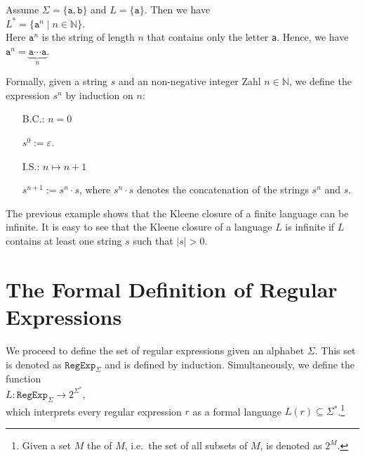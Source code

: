 \exampleEng
Assume $\Sigma = \{ \texttt{a}, \texttt{b} \}$ and  $L = \{ \texttt{a} \}$.  Then we have
\\[0.2cm]
\hspace*{1.3cm}
$L^* = \{ \texttt{a}^n \mid n \in \mathbb{N} \}$.
\\[0.2cm]
Here $\texttt{a}^n$ is the string of length $n$ that contains only the letter \texttt{a}.  Hence, we have 
\\[0.2cm]
\hspace*{1.3cm}
$\texttt{a}^n = \underbrace{\texttt{a} \cdots \texttt{a}}_n$.  \eox 


Formally, given a string $s$ and an non-negative integer Zahl $n \in \mathbb{N}$, we define the expression
 $s^n$ by induction on  $n$:
\begin{enumerate}
\item[B.C.:] $n = 0$

             $s^0 := \varepsilon$. 
\item[I.S.:] $n \mapsto n + 1$

             $s^{n+1} := s^n\cdot s$, \quad where $s^n \cdot s$ denotes the concatenation of the strings $s^n$ and $s$.
             \eox
\end{enumerate}

The previous example shows that the Kleene closure of a finite language can be infinite.
It is easy to see that the Kleene closure of a language $L$ is infinite
if $L$ contains at least one string $s$ such that $|s| > 0$.
\vspace*{0.3cm}

\section{The Formal Definition of Regular Expressions}
We proceed to define the set of regular expressions given an  alphabet $\Sigma$.  This set is
denoted as $\texttt{RegExp}_\Sigma$  
and is defined by induction.  Simultaneously,  we define
the function
\\[0.2cm]
\hspace*{1.3cm}
$L: \texttt{RegExp}_\Sigma \rightarrow 2^{\Sigma^*}$,
\\[0.2cm]
which interprets every regular expression  $r$ as a formal language $L(r) \subseteq \Sigma^*$.\footnote{
  Given a set $M$ the   of $M$, i.e.~the set of all subsets of $M$, is denoted
  as $2^M$.  
}

